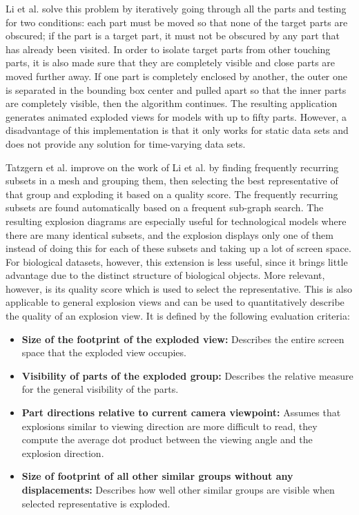 Li et al. solve this problem by iteratively going through all the parts and testing for two conditions: each part must be moved so that none of the target parts are obscured; if the part is a target part, it must not be obscured by any part that has already been visited. 
In order to isolate target parts from other touching parts, it is also made sure that they are completely visible and close parts are moved further away. 
If one part is completely enclosed by another, the outer one is separated in the bounding box center and pulled apart so that the inner parts are completely visible, then the algorithm continues.
The resulting application generates animated exploded views for models with up to fifty parts. 
However, a disadvantage of this implementation is that it only works for static data sets and does not provide any solution for time-varying data sets.

Tatzgern et al. improve on the work of Li et al. by finding frequently recurring subsets in a mesh and grouping them, then selecting the best representative of that group and exploding it based on a quality score.\cite{Tatzgern_2010}
The frequently recurring subsets are found automatically based on a frequent sub-graph search. %
The resulting explosion diagrams are especially useful for technological models where there are many identical subsets, and the explosion displays only one of them instead of doing this for each of these subsets and taking up a lot of screen space.  
For biological datasets, however, this extension is less useful, since it brings little advantage due to the distinct structure of biological objects.
More relevant, however, is its quality score which is used to select the representative. This is also applicable to general explosion views and can be used to quantitatively describe the quality of an explosion view. It is defined by the following evaluation criteria: 


\begin{itemize}
	\item \textbf{Size of the footprint of the exploded view:} Describes the entire screen space that the exploded view occupies.
	\item \textbf{Visibility of parts of the exploded group:} Describes the relative measure for the general visibility of the parts.
	\item \textbf{Part directions relative to current camera viewpoint:} Assumes that explosions similar to viewing direction are more difficult to read, they compute the average dot product between the viewing angle and the explosion direction.
	\item \textbf{Size of footprint of all other similar groups without any displacements:} Describes how well other similar groups are visible when selected representative is exploded.
\end{itemize}

